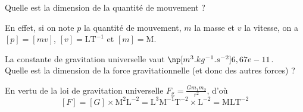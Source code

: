 \debutEntrainement


\begin{enonce}
	Quelle est la dimension de la quantité de mouvement ?
\end{enonce}


\begin{corrige}
En effet, si on note $p$ la quantité de mouvement, $m$ la masse et $v$ la vitesse, on a $[p]=[mv]$, $[v]=\mathrm{LT^{-1}}$ et $[m]=\mathrm{M}$.
\end{corrige}


\begin{enonce}
La constante de gravitation universelle vaut $\np[m^3.kg^{-1}.s^{-2}]{6,67e-11}$. \\
Quelle est la dimension de la force gravitationnelle (et donc des autres forces) ?
\end{enonce}


\begin{corrige}
En vertu de la loi de gravitation universelle $F_\text{g}=\frac{Gm_1m_2}{r^2}$, d'où
\[
[F]=[G] \times \mathrm{M^2 L^{-2}} = \mathrm{L^3 M^{-1} T^{-2}}\times\mathrm{L^{-2}}=\mathrm{MLT^{-2}}
\]
\end{corrige}

\finEntrainement

\newpage
\hauteurLargeurCadreReponse		{8mm}{7cm}
\initialisationEntrainement

